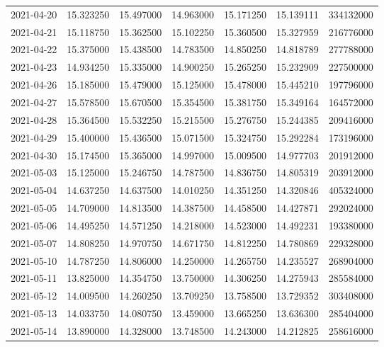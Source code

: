 \begin{tabular}{lrrrrrr}
2021-04-20 &   15.323250 &   15.497000 &   14.963000 &   15.171250 &   15.139111 &   334132000 \\
2021-04-21 &   15.118750 &   15.362500 &   15.102250 &   15.360500 &   15.327959 &   216776000 \\
2021-04-22 &   15.375000 &   15.438500 &   14.783500 &   14.850250 &   14.818789 &   277788000 \\
2021-04-23 &   14.934250 &   15.335000 &   14.900250 &   15.265250 &   15.232909 &   227500000 \\
2021-04-26 &   15.185000 &   15.479000 &   15.125000 &   15.478000 &   15.445210 &   197796000 \\
2021-04-27 &   15.578500 &   15.670500 &   15.354500 &   15.381750 &   15.349164 &   164572000 \\
2021-04-28 &   15.364500 &   15.532250 &   15.215500 &   15.276750 &   15.244385 &   209416000 \\
2021-04-29 &   15.400000 &   15.436500 &   15.071500 &   15.324750 &   15.292284 &   173196000 \\
2021-04-30 &   15.174500 &   15.365000 &   14.997000 &   15.009500 &   14.977703 &   201912000 \\
2021-05-03 &   15.125000 &   15.246750 &   14.787500 &   14.836750 &   14.805319 &   203912000 \\
2021-05-04 &   14.637250 &   14.637500 &   14.010250 &   14.351250 &   14.320846 &   405324000 \\
2021-05-05 &   14.709000 &   14.813500 &   14.387500 &   14.458500 &   14.427871 &   292024000 \\
2021-05-06 &   14.495250 &   14.571250 &   14.218000 &   14.523000 &   14.492231 &   193380000 \\
2021-05-07 &   14.808250 &   14.970750 &   14.671750 &   14.812250 &   14.780869 &   229328000 \\
2021-05-10 &   14.787250 &   14.806000 &   14.250000 &   14.265750 &   14.235527 &   268904000 \\
2021-05-11 &   13.825000 &   14.354750 &   13.750000 &   14.306250 &   14.275943 &   285584000 \\
2021-05-12 &   14.009500 &   14.260250 &   13.709250 &   13.758500 &   13.729352 &   303408000 \\
2021-05-13 &   14.033750 &   14.080750 &   13.459000 &   13.665250 &   13.636300 &   285404000 \\
2021-05-14 &   13.890000 &   14.328000 &   13.748500 &   14.243000 &   14.212825 &   258616000 \\

\end{tabular}
